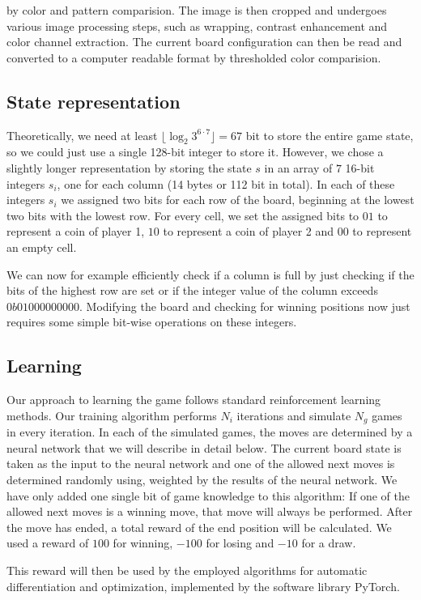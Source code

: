 \documentclass[10pt,twocolumn,letterpaper]{article}
\begin{document}
 by color and pattern comparision.
The image is then cropped and undergoes various image processing steps, such as wrapping, contrast enhancement and color channel extraction.
The current board configuration can then be read and converted to a computer readable format by thresholded color comparision.

\subsection{State representation}
Theoretically, we need at least $\lfloor \log_2 3^{6\cdot 7} \rfloor = 67$ bit to store the entire game state, so we could just use a single
128-bit integer to store it.
However, we chose a slightly longer representation by storing the state $s$ in an array of $7$ 16-bit integers $s_i$, one for each column (14 bytes or 112 bit in total).
In each of these integers $s_i$ we assigned two bits for each row of the board, beginning at the lowest two bits with the lowest row.
For every cell, we set the assigned bits to $01$ to represent a coin of player 1, $10$ to represent a coin of player 2 and $00$ to represent an empty cell.

We can now for example efficiently check if a column is full by just checking if the bits of the highest row are set or if the integer value of the column exceeds $0b01000000000$.
Modifying the board and checking for winning positions now just requires some simple bit-wise operations on these integers.

\subsection{Learning}
Our approach to learning the game follows standard reinforcement learning methods.
Our training algorithm performs $N_i$ iterations and simulate $N_g$ games in every iteration.
In each of the simulated games, the moves are determined by a neural network that we will describe in detail below.
The current board state is taken as the input to the neural network and one of the allowed next moves is determined randomly using, weighted by the results of the neural network.
We have only added one single bit of game knowledge to this algorithm: If one of the allowed next moves is a winning move, that move will always be performed.
After the move has ended, a total reward of the end position will be calculated.
We used a reward of $100$ for winning, $-100$ for losing and $-10$ for a draw.

This reward will then be used by the employed algorithms for automatic differentiation and optimization\cite{Adam}, implemented by the software library PyTorch\cite{PyTorch}.
\end{document}
